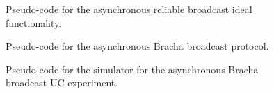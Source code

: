 \begin{figure}[h]
\centering
	
	\caption{Pseudo-code for the asynchronous reliable broadcast ideal functionality.}
	\label{fig:f_rbc}
\end{figure}

\begin{figure}[h]
\centering
	
	\caption{Pseudo-code for the asynchronous Bracha broadcast protocol.}
	\label{fig:prot_bracha_async}
\end{figure}

\begin{figure}[h]
\centering
	
	\caption{Pseudo-code for the simulator for the asynchronous Bracha broadcast UC experiment.}
	\label{fig:sim_bracha_async}
\end{figure}

